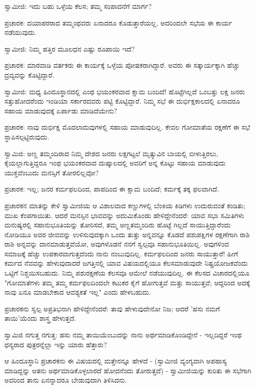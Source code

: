 ಸ್ವಾಮೀಜಿ: ಇದು ಬಹು ಒಳ್ಳೆಯ ಕೆಲಸ; ತಮ್ಮ ಸಂಪಾದನೆಗೆ ಮಾರ್ಗ?

ಪ್ರಚಾರಕ: ದಯಾಪರರಾದ ತಮ್ಮಂಥವರು ಏನಾದರೂ ಕೊಡುತ್ತಾರೆಯಲ್ಲ, ಅದರಿಂದಲೇ ಸಭೆಯ ಈ ಕಾರ್ಯ ನಡೆಯುವುದು.

ಸ್ವಾಮೀಜಿ: ನಿಮ್ಮ ಹತ್ತಿರ ಮೂಲಧನ ಎಷ್ಟು ರೂಪಾಯಿ ಇದೆ?

ಪ್ರಚಾರಕ: ಮಾರವಾಡಿ ವರ್ತಕರು ಈ ಕಾರ್ಯಕ್ಕೆ ಒಳ್ಳೆಯ ಪೋಷಕರಾಗಿದ್ದಾರೆ. ಅವರು ಈ ಸತ್ಕಾರ್ಯಕ್ಕಾಗಿ ಹೆಚ್ಚು ದ್ರವ್ಯವನ್ನು ಕೊಟ್ಟಿದ್ದಾರೆ.

ಸ್ವಾಮೀಜಿ: ಮಧ್ಯ ಹಿಂದೂಸ್ಥಾನದಲ್ಲಿ ಎಂಥ ಭಯಂಕರವಾದ ಕ್ಷಾಮ ಬಂದಿದೆ! ಹೊಟ್ಟೆಗಿಲ್ಲದೆ ಒಂಬತ್ತು ಲಕ್ಷ ಜನರು ಸತ್ತುಹೋದರೆಂದು ಇಂಡಿಯಾ ಸರ್ಕಾರದವರು ಪಟ್ಟಿ ಕೊಟ್ಟಿದ್ದಾರೆ. ನಿಮ್ಮ ಸಭೆ ಈ ದುರ್ಭಿಕ್ಷಕಾಲದಲ್ಲಿ ಏನಾದರೂ ಸಹಾಯ ಮಾಡುವುದಕ್ಕೆ ಏರ್ಪಾಡು ಮಾಡಿದೆಯೇನು?

ಪ್ರಚಾರಕ: ನಾವು ದುರ್ಭಿಕ್ಷ ಮೊದಲಾದುವುಗಳಲ್ಲಿ ಸಹಾಯ ಮಾಡುವುದಿಲ್ಲ. ಕೇವಲ ಗೋಮಾತೆಯ ರಕ್ಷಣೆಗೆ ಈ ಸಭೆ ಸ್ಥಾಪಿಸಲ್ಪಟ್ಟಿರುವುದು.

ಸ್ವಾಮಿಜಿ: ಅಣ್ಣ ತಮ್ಮಂದಿರಾದ ನಿಮ್ಮ ದೇಶದ ಜನರು ಲಕ್ಷಗಟ್ಟಲೆ ಮೃತ್ಯುವಿನ ಬಾಯಲ್ಲಿ ಬೀಳುತ್ತಿರಲು, ಕೈಯಲ್ಲಾಗುತ್ತಿದ್ದರೂ ಇಂಥ ಭಯಂಕರವಾದ ದುಷ್ಕಾಲದಲ್ಲಿ ಅವರಿಗೆ ಅನ್ನ ಕೊಟ್ಟು ಸಹಾಯ ಮಾಡುವುದು ಯುಕ್ತವೆಂಬುದು ಮನಸ್ಸಿಗೆ ತೋರಲಿಲ್ಲವೋ?

ಪ್ರಚಾರಕ: ಇಲ್ಲ; ಜನರ ಕರ್ಮಫಲದಿಂದ, ಪಾಪದಿಂದ ಈ ಕ್ಷಾಮ ಬಂದಿದೆ; ಕರ್ಮಕ್ಕೆ ತಕ್ಕ ಫಲವಾಗಿದೆ.

ಪ್ರಚಾರಕನ ಮಾತನ್ನು ಕೇಳಿ ಸ್ವಾಮೀಜಿಯ ಆ ವಿಶಾಲವಾದ ಕಣ್ಣುಗಳಲ್ಲಿ ಬೆಂಕಿಯ ಕಿಡಿಗಳು ಉದುರುವಂತೆ ಕಂಡಿತು; ಮುಖ ಕೆಂಪಗಾಯಿತು. ಆದರೆ ಮನಸ್ಸಿನ ಭಾವವನ್ನು ಅದುಮಿಕೊಂಡು ಹೇಳಿದ್ದೇನೆಂದರೆ: ಯಾವ ಸಭಾ ಸಮಿತಿಗಳು ಮನುಷ್ಯರಲ್ಲಿ ಸಹಾನುಭೂತಿಯನ್ನು ತೋರಿಸದೆ, ತಮ್ಮ ಅಣ್ಣತಮ್ಮಂದಿರು ಹೊಟ್ಟೆ ಗಿಲ್ಲದೆ ಸಾಯುತ್ತಿದ್ದಾರೆಂದು ನೋಡಿಯೂ ಅವರ ಜೀವವನ್ನು ಉಳಿಸುವುದಕ್ಕಾಗಿ ಒಂದು ತುತ್ತು ಅನ್ನವನ್ನೂ ಕೊಡದೆ ಪಶುಪಕ್ಷಿಗಳ ರಕ್ಷಣೆಗಾಗಿ ರಾಶಿ ರಾಶಿ ಅನ್ನವನ್ನು ದಾನಮಾಡುತ್ತವೆಯೋ, ಅವುಗಳೊಡನೆ ನನಗೆ ಸ್ವಲ್ಪವೂ ಸಹಾನುಭೂತಿಯಿಲ್ಲ. ಅವುಗಳಿಂದ ಸಮಾಜಕ್ಕೆ ಹೆಚ್ಚು ಉಪಕಾರವಾಗುತ್ತದೆಂದು ನಾನು ನಂಬುವುದಿಲ್ಲ. ಕರ್ಮಫಲದಿಂದ ಜನರು ಸಾಯುತ್ತಾರೆ! ಹೀಗೆ ಕರ್ಮದ ನೆವವನ್ನು ಹೇಳುವುದಾದರೆ ಜಗತ್ತಿನಲ್ಲಿ ಯಾವ ವಿಷಯದಲ್ಲಿಯೂ ಕೆಲಸಮಾಡುವುದೇ ನಿಷ್ಪ್ರಯೋಜಕವೆಂದು ಒಟ್ಟಿಗೆ ನಿಶ್ಚಯಿಸಬಹುದು. ನಿಮ್ಮ ಪಶುರಕ್ಷಣೆಯ ಕೆಲಸವೂ ಆಮೇಲೆ ನಡೆಯುವುದಿಲ್ಲ. ಈ ಕೆಲಸದ ವಿಚಾರದಲ್ಲಿಯೂ "ಗೋಮಾತೆಗಳು ತಮ್ಮ ತಮ್ಮ ಕರ್ಮಫಲದಿಂದಲೇ ಕಟುಕರ ಕೈಗೆ ಹೋಗುತ್ತವೆ ಮತ್ತು ಸಾಯುತ್ತವೆ; ಆದ್ದರಿಂದ ಅದಕ್ಕೆ ನಾವು ಏನೂ ಮಾಡಬೇಕಾದ ಆವಶ್ಯಕತೆ ಇಲ್ಲ" ಎಂದು ಹೇಳಬಹುದು.

ಪ್ರಚಾರಕನು ಸ್ವಲ್ಪ ಅಪ್ರತಿಭನಾಗಿ ಹೇಳಿದ್ದೇನೆಂದರೆ: ತಾವು ಹೇಳುವುದೇನೋ ನಿಜ; ಆದರೆ 'ಹಸು ನಮಗೆ ತಾಯಿ'ಯೆಂದು ಶಾಸ್ತ್ರ ಹೇಳುತ್ತದೆ.

ಸ್ವಾಮಿಜಿ ನಗುತ್ತ ನಗುತ್ತ: ಹಸು ನಮ್ಮ ತಾಯಿಯೆಂಬುದನ್ನು ನಾನು ಅರ್ಥಮಾಡಿಕೊಂಡಿದ್ದೇನೆ - ಇಲ್ಲದಿದ್ದರೆ ಇಂಥ ಧನ್ಯರಾದ ಪುತ್ರರನ್ನೆಲ್ಲಾ ಇನ್ನು ಯಾರು ಹೆತ್ತಾರು?

ಆ ಹಿಂದೂಸ್ಥಾನಿ ಪ್ರಚಾರಕನು ಈ ವಿಷಯದಲ್ಲಿ ಮತ್ತೇನನ್ನೂ ಹೇಳದೆ - (ಸ್ವಾಮೀಜಿ ವ್ಯಂಗ್ಯವಾಗಿ ಅಪಹಾಸ್ಯ ಮಾಡಿದ್ದನ್ನು ಆತನು ಅರ್ಥಮಾಡಿಕೊಳ್ಳಲಾರದೆ ಹೋದನೆಂದು ತೋರುತ್ತದೆ) - ಸ್ವಾಮೀಜಿಯನ್ನು ಕುರಿತು ಈ ಸಭೆಗಾಗಿ ಅವರಿಂದ ತಾನು ಏನನ್ನಾದರೂ ಬೇಡುವುದಾಗಿ ತಿಳಿಸಿದನು.

